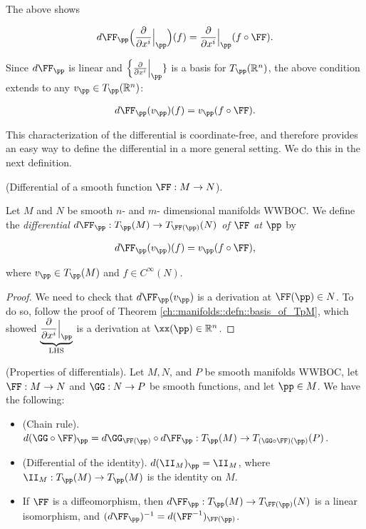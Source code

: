 \begin{defn}
    The above shows
    
    \begin{align*}
        d\FF_\pp \Big( \frac{\pd}{\pd x^i}\Big|_\pp \Big)(f) = \frac{\pd}{\pd x^i}\Big|_\pp (f \circ \FF).
    \end{align*}
    
    Since $d\FF_\pp$ is linear and $\Big\{ \frac{\pd}{\pd x^i}\Big|_\pp \}$ is a basis for $T_\pp(\R^n)$, the above condition extends to any $v_\pp \in T_\pp(\R^n)$:
    
    \begin{align*}
        d\FF_\pp (v_\pp )(f) = v_\pp (f \circ \FF).
    \end{align*}
\end{defn}

This characterization of the differential is coordinate-free, and therefore provides an easy way to define the differential in a more general setting. We do this in the next definition. 

\begin{defn}
\label{ch::manifolds::defn::differential_smooth_function_abstract}
    (Differential of a smooth function $\FF:M \rightarrow N$).
    
    Let $M$ and $N$ be smooth $n$- and $m$- dimensional manifolds WWBOC. We define the \textit{differential $d\FF_\pp:T_\pp(M) \rightarrow T_{\FF(\pp)}(N)$ of $\FF$ at $\pp$} by
    
    \begin{align*}
        d\FF_\pp(v_\pp)(f) = v_\pp(f \circ \FF),
    \end{align*}
    
    where $v_\pp \in T_\pp(M)$ and $f \in C^\infty(N)$.
\end{defn}

\begin{proof}
    We need to check that $d\FF_\pp(v_\pp)$ is a derivation at $\FF(\pp) \in N$. To do so, follow the proof of Theorem \ref{ch::manifolds::defn::basis_of_TpM}, which showed $\underbrace{\frac{\pd}{\pd x^i}\Big|_\pp}_{\text{LHS}}$ is a derivation at $\xx(\pp) \in \R^n$.
\end{proof}

\begin{theorem}
     (Properties of differentials). Let $M, N$, and $P$ be smooth manifolds WWBOC, let $\FF:M \rightarrow N$ and $\GG:N \rightarrow P$ be smooth functions, and let $\pp \in M$. We have the following:
    
    \begin{itemize}
        \item (Chain rule). $d(\GG \circ \FF)_\pp = d\GG_{\FF(\pp)} \circ d\FF_\pp:T_\pp(M) \rightarrow T_{(\GG \circ \FF)(\pp)}(P)$.
        \item (Differential of the identity). $d(\II_M)_\pp = \II_M$, where $\II_M:T_\pp(M) \rightarrow T_\pp(M)$ is the identity on $M$.
        \item If $\FF$ is a diffeomorphism, then $d\FF_\pp:T_\pp(M) \rightarrow T_{\FF(\pp)}(N)$ is a linear isomorphism, and $(d\FF_\pp)^{-1} = d(\FF^{-1})_{\FF(\pp)}$.
    \end{itemize}
\end{theorem}

